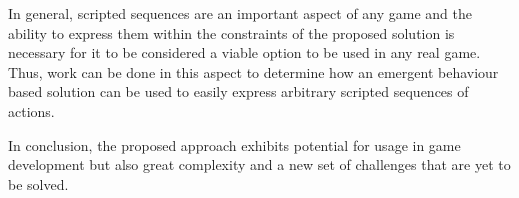 In general, scripted sequences are an important aspect of any game and the ability to express them within the constraints of the proposed solution is necessary for it to be considered a viable option to be used in any real game.
Thus, work can be done in this aspect to determine how an emergent behaviour based solution can be used to easily express arbitrary scripted sequences of actions.

In conclusion, the proposed approach exhibits potential for usage in game development but also great complexity and a new set of challenges that are yet to be solved.
